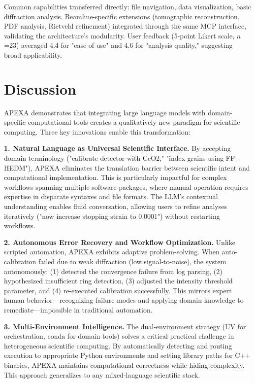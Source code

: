 \documentclass[11pt]{article}
\begin{document}
Common capabilities transferred directly: file navigation, data visualization, basic diffraction analysis. Beamline-specific extensions (tomographic reconstruction, PDF analysis, Rietveld refinement) integrated through the same MCP interface, validating the architecture's modularity. User feedback (5-point Likert scale, $n$=23) averaged 4.4 for "ease of use" and 4.6 for "analysis quality," suggesting broad applicability.

\section{Discussion}

APEXA demonstrates that integrating large language models with domain-specific computational tools creates a qualitatively new paradigm for scientific computing. Three key innovations enable this transformation:

\textbf{1. Natural Language as Universal Scientific Interface.} By accepting domain terminology ("calibrate detector with CeO2," "index grains using FF-HEDM"), APEXA eliminates the translation barrier between scientific intent and computational implementation. This is particularly impactful for complex workflows spanning multiple software packages, where manual operation requires expertise in disparate syntaxes and file formats. The LLM's contextual understanding enables fluid conversation, allowing users to refine analyses iteratively ("now increase stopping strain to 0.0001") without restarting workflows.

\textbf{2. Autonomous Error Recovery and Workflow Optimization.} Unlike scripted automation, APEXA exhibits adaptive problem-solving. When auto-calibration failed due to weak diffraction (low signal-to-noise), the system autonomously: (1) detected the convergence failure from log parsing, (2) hypothesized insufficient ring detection, (3) adjusted the intensity threshold parameter, and (4) re-executed calibration successfully. This mirrors expert human behavior—recognizing failure modes and applying domain knowledge to remediate—impossible in traditional automation.

\textbf{3. Multi-Environment Intelligence.} The dual-environment strategy (UV for orchestration, conda for domain tools) solves a critical practical challenge in heterogeneous scientific computing. By automatically detecting and routing execution to appropriate Python environments and setting library paths for C++ binaries, APEXA maintains computational correctness while hiding complexity. This approach generalizes to any mixed-language scientific stack.
\end{document}
